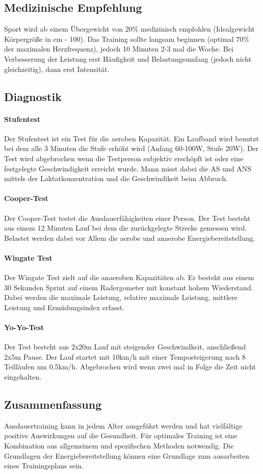 \subsection{Medizinische Empfehlung}
Sport wird ab einem Übergewicht von 20\% medizinisch empfohlen (Idealgewicht Körpergröße in cm - 100).
Das Training sollte langsam beginnen (optimal 70\% der maximalen Herzfrequenz), jedoch 10 Minuten 2-3 mal die Woche.
Bei Verbesserung der Leistung erst Häufigkeit und Belastungsumfang (jedoch nicht gleichzeitig), dann erst Intensität.

\subsection{Diagnostik}
\paragraph{Stufentest}
Der Stufentest ist ein Test für die aeroben Kapazität.
Ein Laufband wird benutzt bei dem alle 3 Minuten die Stufe erhöht wird (Anfang 60-100W, Stufe 20W).
Der Test wird abgebrochen wenn die Testperson subjektiv erschöpft ist oder eine festgelegte Geschwindigkeit erreicht wurde.
Mann misst dabei die AS und ANS mittels der Laktatkonzentration und die Geschwindikeit beim Abbruch.
\paragraph{Cooper-Test}
Der Cooper-Test testet die Ausdauerfähigkeiten einer Person.
Der Test besteht aus einem 12 Minuten Lauf bei dem die zurückgelegte Strecke gemessen wird.
Belastet werden dabei vor Allem die aerobe und anaerobe Energiebereitstellung.
\paragraph{Wingate Test}
Der Wingate Test zielt auf die anaeroben Kapazitäten ab.
Er besteht aus einem 30 Sekunden Sprint auf einem Radergometer mit konstant hohem Wiederstand.
Dabei werden die maximale Leistung, relative maximale Leistung, mittlere Leistung und Ermüdungsindex erfasst.
\paragraph{Yo-Yo-Test}
Der Test besteht aus 2x20m Lauf mit steigender Geschwindkeit, anschließend 2x5m Pause.
Der Lauf startet mit 10km/h mit einer Temposteigerung nach 8 Teilläufen um 0.5km/h.
Abgebrochen wird wenn zwei mal in Folge die Zeit nicht eingehalten.

\subsection{Zusammenfassung}
Ausdauertraining kann in jedem Alter ausgeführt werden und hat vielfältige positive Auswirkungen auf die Gesundheit.
Für optimales Training ist eine Kombination aus allgemeinem und spezifischen Methoden notwendig.
Die Grundlagen der Energiebereitstellung können eine Grundlage zum ausarbeiten eines Trainingsplans sein.
